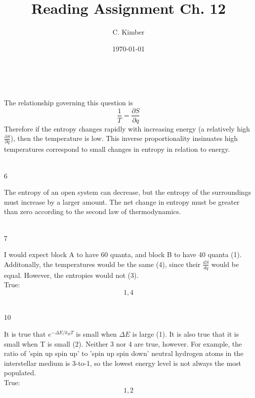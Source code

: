 \documentclass[a4paper,11pt]{article}
\begin{document}
\title{Reading Assignment Ch. 12}
\date{\today}
\author{C. Kimber}
\maketitle
\newpage

\\
\begin{center}
The relationship governing this question is
$$\frac{1}{T} = \frac{\partial S}{\partial q}$$
Therefore if the entropy changes rapidly with increasing energy
(a relatively high $\frac{\partial S}{\partial q}$), then
the temperature is low. This inverse proportionality
insinuates high temperatures correspond to small changes
in entropy in relation to energy.
\end{center}

\\
6
\\
\begin{center}
The entropy of an open system can decrease, but the entropy
of the surroundings must increase by a larger amount. The net
change in entropy must be greater than zero according to the
second law of thermodynamics.
\end{center}

\\
7
\\
\begin{center}
I would expect block A to have 60 quanta, and block B to have
40 quanta (1). Additonally, the temperatures would be the same (4),
since their $\frac{dS}{dq}$ would be equal. However, the entropies
would not (3).
\\
True:
$$1, 4$$
\end{center}

\\
10
\\
\begin{center}
It is true that $e^{-\Delta E/k_BT}$ is small when $\Delta E$ is
large (1). It is also true that it is small when T is small (2).
Neither 3 nor 4 are true, however. For example, the ratio of
'spin up spin up' to 'spin up spin down' neutral hydrogen
atoms in the interstellar medium is 3-to-1, so the lowest
energy level is not always the most populated.
\\
True:
$$1, 2$$
\end{center}
\end{document}
